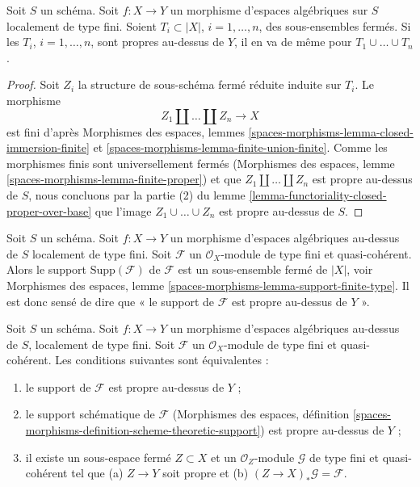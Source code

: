 \begin{lemma}
\label{lemma-union-closed-proper-over-base}
Soit $S$ un schéma.
Soit $f : X \to Y$ un morphisme d'espaces algébriques sur $S$
localement de type fini.
Soient $T_i \subset |X|$, $i = 1, \ldots, n$, des sous-ensembles fermés.
Si les $T_i$, $i = 1, \ldots, n$, sont propres au-dessus de $Y$, il en va de même
pour $T_1 \cup \ldots \cup T_n$.
\end{lemma}

\begin{proof}
Soit $Z_i$ la structure de sous-schéma fermé réduite induite sur $T_i$.
Le morphisme
$$
Z_1 \amalg \ldots \amalg Z_n \longrightarrow X
$$
est fini d'après Morphismes des espaces, lemmes
\ref{spaces-morphisms-lemma-closed-immersion-finite} et
\ref{spaces-morphisms-lemma-finite-union-finite}.
Comme les morphismes finis sont universellement fermés
(Morphismes des espaces, lemme \ref{spaces-morphisms-lemma-finite-proper})
et que $Z_1 \amalg \ldots \amalg Z_n$ est propre au-dessus de $S$,
nous concluons par la partie (2) du lemme
\ref{lemma-functoriality-closed-proper-over-base}
que l'image $Z_1 \cup \ldots \cup Z_n$ est propre au-dessus de $S$.
\end{proof}

\noindent
Soit $S$ un schéma.
Soit $f : X \to Y$ un morphisme d'espaces algébriques au-dessus de $S$
localement de type fini. Soit $\mathcal{F}$ un
$\mathcal{O}_X$-module de type fini et quasi-cohérent. Alors le support
$\text{Supp}(\mathcal{F})$ de $\mathcal{F}$ est un sous-ensemble fermé de $|X|$, voir
Morphismes des espaces, lemme \ref{spaces-morphisms-lemma-support-finite-type}.
Il est donc sensé de dire que
« le support de $\mathcal{F}$ est propre au-dessus de $Y$ ».

\begin{lemma}
\label{lemma-module-support-proper-over-base}
Soit $S$ un schéma. Soit $f : X \to Y$ un morphisme d'espaces
algébriques au-dessus de $S$, localement de type fini.
Soit $\mathcal{F}$ un $\mathcal{O}_X$-module de type fini et
quasi-cohérent. Les conditions suivantes sont équivalentes :
\begin{enumerate}
\item le support de $\mathcal{F}$ est propre au-dessus de $Y$ ;
\item le support schématique de $\mathcal{F}$
(Morphismes des espaces, définition
\ref{spaces-morphisms-definition-scheme-theoretic-support})
est propre au-dessus de $Y$ ;
\item il existe un sous-espace fermé $Z \subset X$ et un
$\mathcal{O}_Z$-module $\mathcal{G}$ de type fini et quasi-cohérent
tel que (a) $Z \to Y$ soit propre et (b)
$(Z \to X)_*\mathcal{G} = \mathcal{F}$.
\end{enumerate}
\end{lemma}

